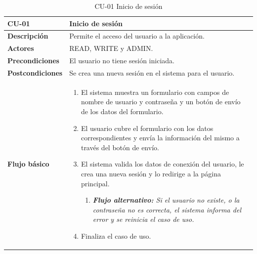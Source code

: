 \begin{table} [H]
    \centering
    \setlength{\leftmargini}{0.4cm}
	\resizebox{14cm}{!} { %
    \begin{tabular}{| m{3cm} | m{11cm} |}   
    \hline
	  \textbf{CU-01} & \textbf{Inicio de sesión} \\\hline
	  \textbf{Descripción} & Permite el acceso del usuario a la aplicación. \\\hline
	  \textbf{Actores} & READ, WRITE y ADMIN. \\\hline
	  \textbf{Precondiciones} & El usuario no tiene sesión iniciada. \\\hline
	  \textbf{Postcondiciones} & Se crea una nueva sesión en el sistema para el usuario. \\\hline
	  \textbf{Flujo básico} & 
		\begin{enumerate}
	  	\item El sistema muestra un formulario con campos de nombre de usuario y contraseña y un botón de envío de los datos del formulario.
		\item El usuario cubre el formulario con los datos correspondientes y envía la información del mismo a través del botón de envío.
	  	\item El sistema valida los datos de conexión del usuario, le crea una nueva sesión y lo redirige a la página principal.	
	  	\begin{enumerate}
		   \item \textit{\textbf{Flujo alternativo:} Si el usuario no existe, o la contraseña no es correcta, el sistema informa del
error y se reinicia el caso de uso.}
		\end{enumerate}   	
	   	\item Finaliza el caso de uso.
	  \end{enumerate} 	  	  
	  \\\hline
    \end{tabular}
    } %
    \caption{CU-01 Inicio de sesión}
    \label{tab:cu-inicio-sesion}
\end{table}




